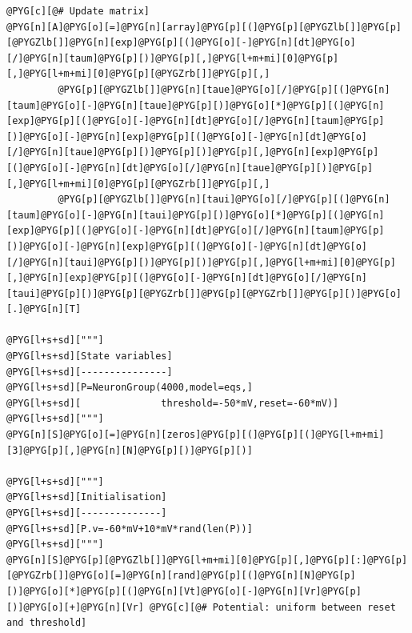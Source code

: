 \documentclass[letterpaper,10pt,english]{manual}
\begin{document}
\begin{Verbatim}[commandchars=@\[\]]
@PYG[c][@# Update matrix]
@PYG[n][A]@PYG[o][=]@PYG[n][array]@PYG[p][(]@PYG[p][@PYGZlb[]]@PYG[p][@PYGZlb[]]@PYG[n][exp]@PYG[p][(]@PYG[o][-]@PYG[n][dt]@PYG[o][/]@PYG[n][taum]@PYG[p][)]@PYG[p][,]@PYG[l+m+mi][0]@PYG[p][,]@PYG[l+m+mi][0]@PYG[p][@PYGZrb[]]@PYG[p][,]
         @PYG[p][@PYGZlb[]]@PYG[n][taue]@PYG[o][/]@PYG[p][(]@PYG[n][taum]@PYG[o][-]@PYG[n][taue]@PYG[p][)]@PYG[o][*]@PYG[p][(]@PYG[n][exp]@PYG[p][(]@PYG[o][-]@PYG[n][dt]@PYG[o][/]@PYG[n][taum]@PYG[p][)]@PYG[o][-]@PYG[n][exp]@PYG[p][(]@PYG[o][-]@PYG[n][dt]@PYG[o][/]@PYG[n][taue]@PYG[p][)]@PYG[p][)]@PYG[p][,]@PYG[n][exp]@PYG[p][(]@PYG[o][-]@PYG[n][dt]@PYG[o][/]@PYG[n][taue]@PYG[p][)]@PYG[p][,]@PYG[l+m+mi][0]@PYG[p][@PYGZrb[]]@PYG[p][,]
         @PYG[p][@PYGZlb[]]@PYG[n][taui]@PYG[o][/]@PYG[p][(]@PYG[n][taum]@PYG[o][-]@PYG[n][taui]@PYG[p][)]@PYG[o][*]@PYG[p][(]@PYG[n][exp]@PYG[p][(]@PYG[o][-]@PYG[n][dt]@PYG[o][/]@PYG[n][taum]@PYG[p][)]@PYG[o][-]@PYG[n][exp]@PYG[p][(]@PYG[o][-]@PYG[n][dt]@PYG[o][/]@PYG[n][taui]@PYG[p][)]@PYG[p][)]@PYG[p][,]@PYG[l+m+mi][0]@PYG[p][,]@PYG[n][exp]@PYG[p][(]@PYG[o][-]@PYG[n][dt]@PYG[o][/]@PYG[n][taui]@PYG[p][)]@PYG[p][@PYGZrb[]]@PYG[p][@PYGZrb[]]@PYG[p][)]@PYG[o][.]@PYG[n][T]

@PYG[l+s+sd]["""]
@PYG[l+s+sd][State variables]
@PYG[l+s+sd][---------------]
@PYG[l+s+sd][P=NeuronGroup(4000,model=eqs,]
@PYG[l+s+sd][              threshold=-50*mV,reset=-60*mV)]
@PYG[l+s+sd]["""]
@PYG[n][S]@PYG[o][=]@PYG[n][zeros]@PYG[p][(]@PYG[p][(]@PYG[l+m+mi][3]@PYG[p][,]@PYG[n][N]@PYG[p][)]@PYG[p][)]

@PYG[l+s+sd]["""]
@PYG[l+s+sd][Initialisation]
@PYG[l+s+sd][--------------]
@PYG[l+s+sd][P.v=-60*mV+10*mV*rand(len(P))]
@PYG[l+s+sd]["""]
@PYG[n][S]@PYG[p][@PYGZlb[]]@PYG[l+m+mi][0]@PYG[p][,]@PYG[p][:]@PYG[p][@PYGZrb[]]@PYG[o][=]@PYG[n][rand]@PYG[p][(]@PYG[n][N]@PYG[p][)]@PYG[o][*]@PYG[p][(]@PYG[n][Vt]@PYG[o][-]@PYG[n][Vr]@PYG[p][)]@PYG[o][+]@PYG[n][Vr] @PYG[c][@# Potential: uniform between reset and threshold]


\end{Verbatim}
\end{document}
